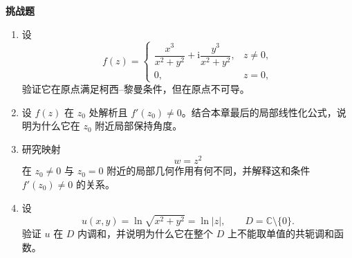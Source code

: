 \textbf{挑战题}

\begin{enumerate}[resume]
    \item 设
    \[
        f(z)=
        \begin{cases}
            \dfrac{x^3}{x^2+y^2}+\mathrm{i}\dfrac{y^3}{x^2+y^2}, & z\neq 0,\\[1em]
            0, & z=0,
        \end{cases}
    \]
    验证它在原点满足柯西--黎曼条件，但在原点不可导。

    \item 设 $f(z)$ 在 $z_0$ 处解析且 $f'(z_0)\neq 0$。结合本章最后的局部线性化公式，说明为什么它在 $z_0$ 附近局部保持角度。

    \item 研究映射
    \[
        w=z^2
    \]
    在 $z_0\neq 0$ 与 $z_0=0$ 附近的局部几何作用有何不同，并解释这和条件 $f'(z_0)\neq 0$ 的关系。

    \item 设
    \[
        u(x,y)=\ln\sqrt{x^2+y^2}=\ln|z|,\qquad D=\mathbb{C}\setminus\{0\}.
    \]
    验证 $u$ 在 $D$ 内调和，并说明为什么它在整个 $D$ 上不能取单值的共轭调和函数。
\end{enumerate}
